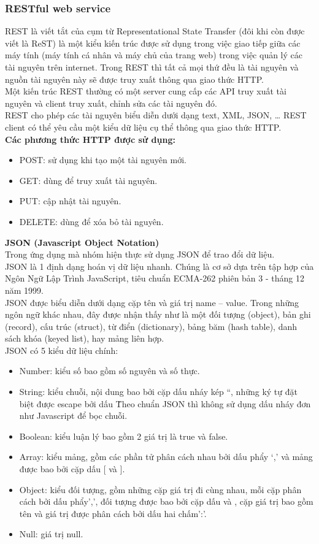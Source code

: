 \documentclass[a4paper,12pt,oneside]{article}
\begin{document}
\subsubsection{RESTful web service}
\noindent REST là viết tắt của cụm từ Representational State Transfer (đôi khi còn được viết là ReST) là một kiểu kiến trúc được sử dụng trong việc giao tiếp giữa các máy tính (máy tính cá nhân và máy chủ của trang web) trong việc quản lý các tài nguyên trên internet. Trong REST thì tất cả mọi thứ đều là tài nguyên và nguồn tài nguyên này sẽ được truy xuất thông qua giao thức HTTP.\\
\noindent Một kiến trúc REST thường có một server cung cấp các API truy xuất tài nguyên và client truy xuất, chỉnh sửa các tài nguyên đó.\\
\noindent REST cho phép các tài nguyên biểu diễn dưới dạng text, XML, JSON, … REST client có thể yêu cầu một kiểu dữ liệu cụ thể thông qua giao thức HTTP.\\
\textbf{Các phương thức HTTP được sử dụng:}
\begin{itemize}
\item POST: sử dụng khi tạo một tài nguyên mới.
\item GET: dùng để truy xuất tài nguyên.
\item PUT: cập nhật tài nguyên.
\item DELETE: dùng để xóa bỏ tài nguyên.
\end{itemize}
\textbf{JSON (Javascript Object Notation)}\\
 Trong ứng dụng mà nhóm hiện thực sử dụng JSON để trao đổi dữ liệu.\\
 JSON là 1 định dạng hoán vị dữ liệu nhanh. Chúng là cơ sở dựa trên tập hợp của Ngôn Ngữ Lập Trình JavaScript, tiêu chuẩn ECMA-262 phiên bản 3 - tháng 12 năm 1999.\\
 JSON được biểu diễn dưới dạng cặp tên và giá trị name – value. Trong những ngôn ngữ khác nhau, đây được nhận thấy như là một đối tượng (object), bản ghi (record), cấu trúc (struct), từ điển (dictionary), bảng băm (hash table), danh sách khóa (keyed list), hay mảng liên hợp.\\
 JSON có 5 kiểu dữ liệu chính:
\begin{itemize}
\item Number: kiểu số bao gồm số nguyên và số thực.
\item String: kiểu chuỗi, nội dung bao bởi cặp dấu nháy kép “, những ký tự đặt biệt được escape bởi dấu \.Theo chuẩn JSON thì không sử dụng dấu nháy đơn như Javascript để bọc chuỗi.
\item Boolean: kiểu luận lý bao gồm 2 giá trị là true và false.
\item Array: kiểu mảng, gồm các phần tử phân cách nhau bởi dấu phẩy ‘,’ và mảng được bao bởi cặp dấu [ và ].
\item Object: kiểu đối tượng, gồm những cặp giá trị đi cùng nhau, mỗi cặp phân cách bởi dấu phẩy’,’, đối tượng được bao bởi cặp dấu { và }, cặp giá trị bao gồm tên và giá trị được phân cách bởi dấu hai chấm’:’.
\item Null: giá trị null.
\end{itemize}
\end{document}

